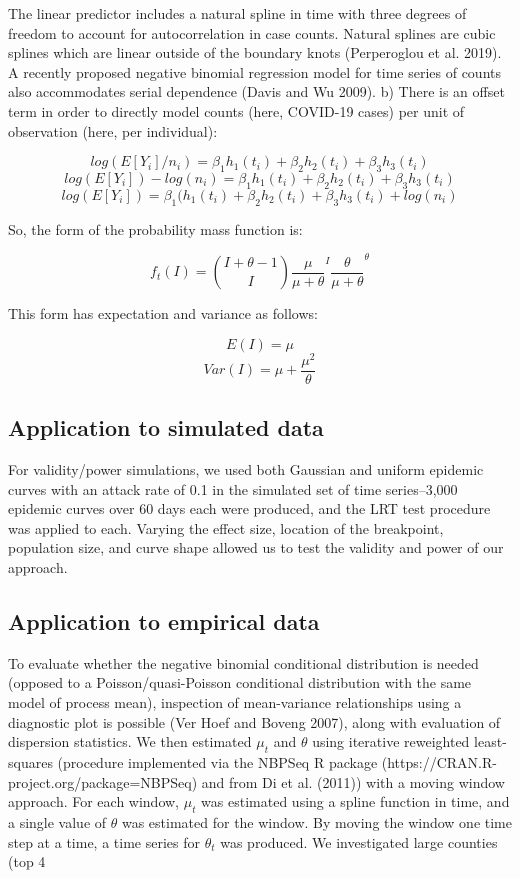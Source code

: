 \documentclass[10pt,letterpaper]{article}
\begin{document}
 The linear predictor includes a natural spline in time with three degrees of freedom to account for autocorrelation in case counts. Natural splines are cubic splines which are linear outside of the boundary knots (Perperoglou et al. 2019). A recently proposed negative binomial regression model for time series of counts also accommodates serial dependence (Davis and Wu 2009). b) There is an offset term in order to directly model counts (here, COVID-19 cases) per unit of observation (here, per individual):

    $$log(E[Y_i]/n_i) = \beta_1h_1(t_i) + \beta_2h_2(t_i) + \beta_3h_3(t_i)$$
    $$log(E[Y_i])-log(n_i) = \beta_1h_1(t_i) + \beta_2h_2(t_i) + \beta_3h_3(t_i)$$
    $$log(E[Y_i]) = \beta_1(h_1(t_i) + \beta_2h_2(t_i) + \beta_3h_3(t_i) + log(n_i)$$

So, the form of the probability mass function is:

$$f_t(I) = {I + \theta - 1 \choose I} \frac{\mu}{\mu+\theta}^I \frac{\theta}{\mu +\theta}^\theta$$

This form has expectation and variance as follows:

$$E(I) = \mu$$
$$Var(I) = \mu + \frac{\mu^2}{\theta}$$

\subsection*{Application to simulated data}

For validity/power simulations, we used both Gaussian and uniform epidemic curves with an attack rate of 0.1 in the simulated set of time series--3,000 epidemic curves over 60 days each were produced, and the LRT test procedure was applied to each. Varying the effect size, location of the breakpoint, population size, and curve shape allowed us to test the validity and power of our approach.

\subsection*{Application to empirical data}
To evaluate whether the negative binomial conditional distribution is needed (opposed to a Poisson/quasi-Poisson conditional distribution with the same model of process mean), inspection of mean-variance relationships using a diagnostic plot is possible (Ver Hoef and Boveng 2007), along with evaluation of dispersion statistics.
We then estimated $\mu_t$ and $\theta$ using iterative reweighted least-squares (procedure implemented via the NBPSeq R package (https://CRAN.R-project.org/package=NBPSeq) and from Di et al. (2011)) with a moving window approach. For each window, $\mu_t$ was estimated using a spline function in time, and a single value of $\theta$ was estimated for the window. By moving the window one time step at a time, a time series for $\theta_t$ was produced. We investigated large counties (top 4%
\end{document}
